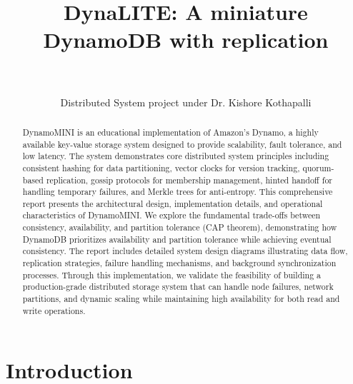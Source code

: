 \documentclass[conference]{IEEEtran}
\begin{document}
\title{DynaLITE: A miniature DynamoDB with replication}

\author{
    \\[0.5ex]
    \parbox{\linewidth}{\centering
        \vspace{0.2cm}
        \footnotesize
        Distributed System project under Dr. Kishore Kothapalli
    }
}

\maketitle

\begin{abstract}
DynamoMINI is an educational implementation of Amazon's Dynamo, a highly available key-value storage system designed to provide scalability, fault tolerance, and low latency. The system demonstrates core distributed system principles including consistent hashing for data partitioning, vector clocks for version tracking, quorum-based replication, gossip protocols for membership management, hinted handoff for handling temporary failures, and Merkle trees for anti-entropy. This comprehensive report presents the architectural design, implementation details, and operational characteristics of DynamoMINI. We explore the fundamental trade-offs between consistency, availability, and partition tolerance (CAP theorem), demonstrating how DynamoDB prioritizes availability and partition tolerance while achieving eventual consistency. The report includes detailed system design diagrams illustrating data flow, replication strategies, failure handling mechanisms, and background synchronization processes. Through this implementation, we validate the feasibility of building a production-grade distributed storage system that can handle node failures, network partitions, and dynamic scaling while maintaining high availability for both read and write operations.
\end{abstract}

\section{Introduction}
\end{document}

